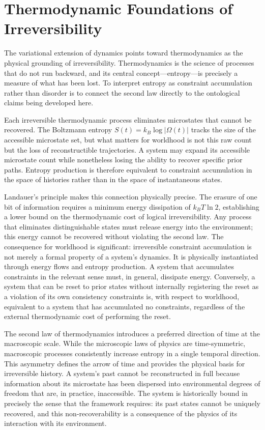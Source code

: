 \documentclass[11pt]{article}
\theoremstyle{definition}
\theoremstyle{remark}
\begin{document}
\section{Thermodynamic Foundations of Irreversibility}

The variational extension of dynamics points toward thermodynamics as the physical grounding
of irreversibility. Thermodynamics is the science of processes that do not run backward, and
its central concept---entropy---is precisely a measure of what has been lost. To interpret
entropy as constraint accumulation rather than disorder is to connect the second law directly
to the ontological claims being developed here.

Each irreversible thermodynamic process eliminates microstates that cannot be recovered.
The Boltzmann entropy $S(t) = k_B \log |\Omega(t)|$ tracks the size of the accessible
microstate set, but what matters for worldhood is not this raw count but the loss of
reconstructible trajectories. A system may expand its accessible microstate count while
nonetheless losing the ability to recover specific prior paths. Entropy production is
therefore equivalent to constraint accumulation in the space of histories rather than in
the space of instantaneous states.

Landauer's principle makes this connection physically precise. The erasure of one bit of
information requires a minimum energy dissipation of $k_B T \ln 2$, establishing a lower
bound on the thermodynamic cost of logical irreversibility. Any process that eliminates
distinguishable states must release energy into the environment; this energy cannot be
recovered without violating the second law. The consequence for worldhood is significant:
irreversible constraint accumulation is not merely a formal property of a system's dynamics.
It is physically instantiated through energy flows and entropy production. A system that
accumulates constraints in the relevant sense must, in general, dissipate energy. Conversely,
a system that can be reset to prior states without internally registering the reset as a
violation of its own consistency constraints is, with respect to worldhood, equivalent to a
system that has accumulated no constraints, regardless of the external thermodynamic cost of
performing the reset.

The second law of thermodynamics introduces a preferred direction of time at the macroscopic
scale. While the microscopic laws of physics are time-symmetric, macroscopic processes
consistently increase entropy in a single temporal direction. This asymmetry defines the
arrow of time and provides the physical basis for irreversible history. A system's past
cannot be reconstructed in full because information about its microstate has been dispersed
into environmental degrees of freedom that are, in practice, inaccessible. The system is
historically bound in precisely the sense that the framework requires: its past states
cannot be uniquely recovered, and this non-recoverability is a consequence of the physics
of its interaction with its environment.
\end{document}
